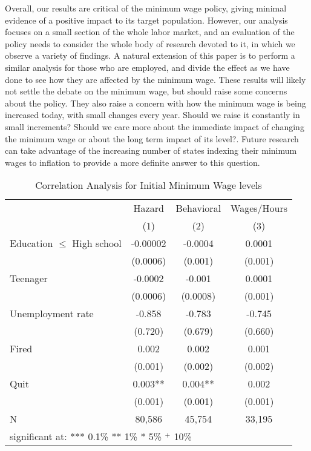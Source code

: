 \documentclass{article}
\begin{document}
Overall, our results are critical of the minimum wage policy, giving minimal evidence of a positive impact to its target population. However, our analysis focuses on a small section of the whole labor market, and an evaluation of the policy needs to consider the whole body of research devoted to it, in which we observe a variety of findings. A natural extension of this paper is to perform a similar analysis for those who are employed, and divide the effect as we have done to see how they are affected by the minimum wage. These results will likely not settle the debate on the minimum wage, but should raise some concerns about the policy. They also raise a concern with how the minimum wage is being increased today, with small changes every year. Should we raise it constantly in small increments? Should we care more about the immediate impact of changing the minimum wage or about the long term impact of its level?. Future research can take advantage of the increasing number of states indexing their minimum wages to inflation to provide a more definite answer to this question.


\newpage

		


\begin{table}[!htbp]
	\centering
	\caption{Correlation Analysis for Initial Minimum Wage levels}
	\begin{tabular}{lccc}
		&Hazard	&Behavioral&Wages/Hours\\
		&(1)	&(2)	&(3)	\\\hline\hline
		Education $\leq$ High school&-0.00002&-0.0004&0.0001\\
		&(0.0006)&(0.001)&(0.001)\\
		Teenager					&-0.0002&-0.001	&0.0001	\\
		&(0.0006)&(0.0008)&(0.001)\\
		Unemployment rate			&-0.858	&-0.783	&-0.745	\\
		&(0.720)&(0.679)&(0.660)\\
		Fired						&0.002	&0.002	&0.001\\
		&(0.001)&(0.002)&(0.002)\\
		Quit						&0.003**&0.004**&0.002	\\
		&(0.001)&(0.001)&(0.001)\\\hdashline
		N							&80,586	&45,754	&33,195	\\\hline\hline
		\multicolumn{4}{l}{\small{significant at: *** 0.1\% ** 1\% * 5\% $^+$ 10\%}}\\
	\end{tabular}\\
	\label{tab:bal_reg}
\end{table}
\end{document}
